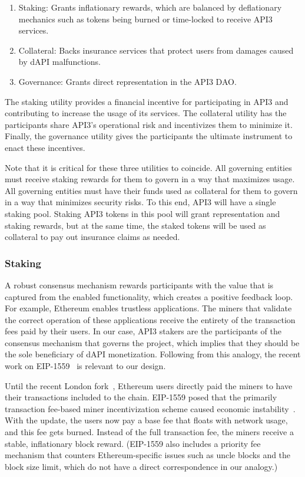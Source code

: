 \documentclass[11pt]{article}
\begin{document}
\begin{enumerate}
    \item Staking: Grants inflationary rewards, which are balanced by deflationary mechanics such as tokens being burned or time-locked to receive API3 services.
    \item Collateral: Backs insurance services that protect users from damages caused by dAPI malfunctions.
    \item Governance: Grants direct representation in the API3 DAO.
\end{enumerate}

The staking utility provides a financial incentive for participating in API3 and contributing to increase the usage of its services.
The collateral utility has the participants share API3’s operational risk and incentivizes them to minimize it.
Finally, the governance utility gives the participants the ultimate instrument to enact these incentives.

Note that it is critical for these three utilities to coincide.
All governing entities must receive staking rewards for them to govern in a way that maximizes usage.
All governing entities must have their funds used as collateral for them to govern in a way that minimizes security risks.
To this end, API3 will have a single staking pool.
Staking API3 tokens in this pool will grant representation and staking rewards, but at the same time, the staked tokens will be used as collateral to pay out insurance claims as needed.

\subsubsection{Staking}
\label{sec:staking}

A robust consensus mechanism rewards participants with the value that is captured from the enabled functionality, which creates a positive feedback loop.
For example, Ethereum enables trustless applications.
The miners that validate the correct operation of these applications receive the entirety of the transaction fees paid by their users.
In our case, API3 stakers are the participants of the consensus mechanism that governs the project, which implies that they should be the sole beneficiary of dAPI monetization.
Following from this analogy, the recent work on EIP-1559~\cite{eip1559} is relevant to our design.

Until the recent London fork~\cite{london}, Ethereum users directly paid the miners to have their transactions included to the chain.
EIP-1559 posed that the primarily transaction fee-based miner incentivization scheme caused economic instability~\cite{roughgarden:2020}.
With the update, the users now pay a base fee that floats with network usage, and this fee gets burned.
Instead of the full transaction fee, the miners receive a stable, inflationary block reward.
(EIP-1559 also includes a priority fee mechanism that counters Ethereum-specific issues such as uncle blocks and the block size limit, which do not have a direct correspondence in our analogy.)
\end{document}
